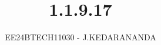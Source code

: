 \documentclass[journal]{IEEEtran}
\begin{document}

\vspace{3cm}

\title{1.1.9.17}
\author{EE24BTECH11030 - J.KEDARANANDA}
{\let\newpage\relax\maketitle}

\renewcommand{\thefigure}{\theenumi}
\renewcommand{\thetable}{\theenumi}
\setlength{\intextsep}{10pt} %


\renewcommand{\thetable}{\theenumi}
\end{document}
